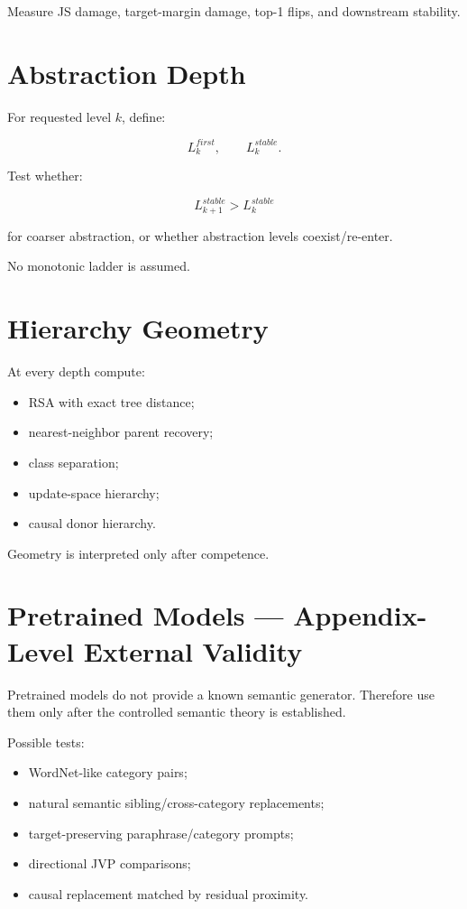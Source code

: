 \documentclass[10pt]{article}
\begin{document}
Measure JS damage, target-margin damage, top-1 flips, and downstream stability.

\section{Abstraction Depth}

For requested level \(k\), define:

\[
L_k^{first},
\qquad
L_k^{stable}.
\]

Test whether:

\[
L_{k+1}^{stable}>L_k^{stable}
\]

for coarser abstraction, or whether abstraction levels coexist/re-enter.

No monotonic ladder is assumed.

\section{Hierarchy Geometry}

At every depth compute:

\begin{itemize}
\item RSA with exact tree distance;
\item nearest-neighbor parent recovery;
\item class separation;
\item update-space hierarchy;
\item causal donor hierarchy.
\end{itemize}

Geometry is interpreted only after competence.

\section{Pretrained Models --- Appendix-Level External Validity}

Pretrained models do not provide a known semantic generator. Therefore use them only after the controlled semantic theory is established.

Possible tests:

\begin{itemize}
\item WordNet-like category pairs;
\item natural semantic sibling/cross-category replacements;
\item target-preserving paraphrase/category prompts;
\item directional JVP comparisons;
\item causal replacement matched by residual proximity.
\end{itemize}
\end{document}
